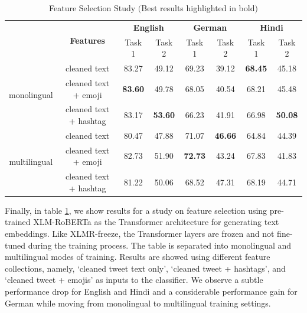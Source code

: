 \documentclass[
]{ceurart}
\begin{document}
\begin{table}
  \begin{tabular*}{\textwidth}{c@{\extracolsep{\fill}} ccccccc}
    \toprule
    & \multirow{2}{*}{\textbf{Features}} & \multicolumn{2}{c}{\textbf{English}} & \multicolumn{2}{c}{\textbf{German}} & \multicolumn{2}{c}{\textbf{Hindi}} \\\cmidrule{3-4} \cmidrule{5-6} \cmidrule{7-8}
    & & Task 1 & Task 2 & Task 1 & Task 2 & Task 1 & Task 2 \\ \midrule
\multirow{3}{*}{monolingual}& cleaned text & 83.27 & 49.12 & 69.23 & 39.12 & \textbf{68.45} & 45.18 \\
& cleaned text + emoji & \textbf{83.60} & 49.78 & 68.05 & 40.54 & 68.21 & 45.48 \\ %
& cleaned text + hashtag & 83.17 & \textbf{53.60} & 66.23 & 41.91 & 66.98 & \textbf{50.08} \\ \midrule %
\multirow{3}{*}{multilingual}& cleaned text & 80.47 & 47.88 & 71.07 & \textbf{46.66} & 64.84 & 44.39 \\ 
& cleaned text + emoji & 82.73 & 51.90 & \textbf{72.73} & 43.24 & 67.83 & 41.83 \\ %
&cleaned text + hashtag & 81.22 & 50.06 & 68.52 & 47.31 & 68.19 & 44.71 \\ %
\end{tabular*}
\caption{Feature Selection Study $($Best results highlighted in bold$)$}
\label{tab:monobase}
\end{table}

Finally, in table \ref{tab:monobase}, we show results for a study on feature selection using pre-trained XLM-RoBERTa as the Transformer architecture for generating text embeddings. Like XLMR-freeze, the Transformer layers are frozen and not fine-tuned during the training process. The table is separated into monolingual and multilingual modes of training. Results are showed using different feature collections, namely, `cleaned tweet text only',  `cleaned tweet + hashtags', and `cleaned tweet + emojis' as inputs to the classifier. We observe a subtle performance drop for English and Hindi and a considerable performance gain for German while moving from monolingual to multilingual training settings.
\end{document}
